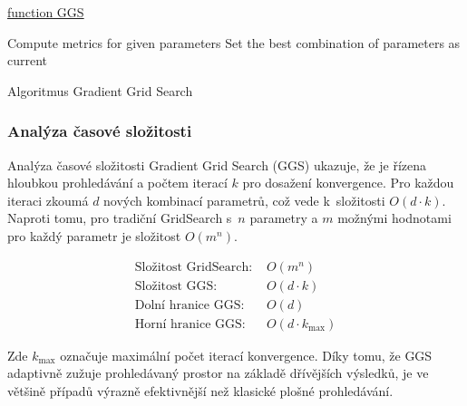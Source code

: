     \begin{algorithm}[h]
        \underline{function GGS}\;
        
        Compute metrics for given parameters\;
        Set the best combination of parameters as current\;
        
         \label{alg:gradient_grid_search}
        \caption{Algoritmus Gradient Grid Search}       
    \end{algorithm}



\subsubsection{Analýza časové složitosti}
Analýza časové složitosti Gradient Grid Search (GGS) ukazuje, že je řízena hloubkou prohledávání a počtem iterací $k$ pro dosažení konvergence. Pro každou iteraci zkoumá $d$ nových kombinací parametrů, což vede k~složitosti $O(d \cdot k)$. Naproti tomu, pro tradiční GridSearch s~$n$ parametry a $m$ možnými hodnotami pro každý parametr je složitost $O(m^n)$.

\begin{align}
\text{Složitost GridSearch: } & O(m^n) \\
\text{Složitost GGS: } & O(d \cdot k) \\
\text{Dolní hranice GGS: } & O(d) \\
\text{Horní hranice GGS: } & O(d \cdot k_{\text{max}})
\end{align}

Zde $k_{\text{max}}$ označuje maximální počet iterací konvergence. Díky tomu, že GGS adaptivně zužuje prohledávaný prostor na základě dřívějších výsledků, je ve většině případů výrazně efektivnější než klasické plošné prohledávání.

